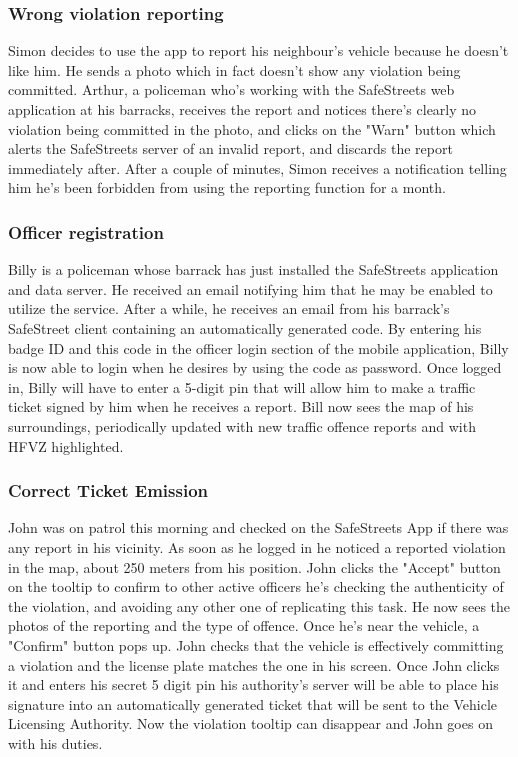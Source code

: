 \documentclass[12pt,a4paper]{article}
\begin{document}
\subsubsection{Wrong violation reporting}
Simon decides to use the app to report his neighbour's vehicle because he doesn't like him. He sends a photo which in fact doesn't show any violation being committed. Arthur, a policeman who's working with the SafeStreets web application at his barracks, receives the report and notices there's clearly no violation being committed in the photo, and clicks on the "Warn" button which alerts the SafeStreets server of an invalid report, and discards the report immediately after. After a couple of minutes, Simon receives a notification telling him he's been forbidden from using the reporting function for a month.

\subsubsection{Officer registration}
Billy is a policeman whose barrack has just installed the SafeStreets application and data server. He received an email notifying him that he may be enabled to utilize the service. After a while, he receives an email from his barrack's SafeStreet client containing an automatically generated code. By entering his badge ID and this code in the officer login section of the mobile application, Billy is now able to login when he desires by using the code as password. Once logged in, Billy will have to enter a 5-digit pin that will allow him to make a traffic ticket signed by him when he receives a report.
Bill now sees the map of his surroundings, periodically updated with new traffic offence reports and with HFVZ highlighted. 

\subsubsection{Correct Ticket Emission}
John was on patrol this morning and checked on the SafeStreets App if there was any report in his vicinity. As soon as he logged in he noticed a reported violation in the map, about 250 meters from his position. John clicks the "Accept" button on the tooltip to confirm to other active officers he's checking the authenticity of the violation, and avoiding any other one of replicating this task. He now sees the photos of the reporting and the type of offence. Once he's near the vehicle, a "Confirm" button pops up. John checks that the vehicle is effectively committing a violation and the license plate matches the one in his screen. Once John clicks it and enters his secret 5 digit pin his authority's server will be able to place his signature into an automatically generated ticket that will be sent to the Vehicle Licensing Authority. Now the violation tooltip can disappear and John goes on with his duties.
\end{document}
